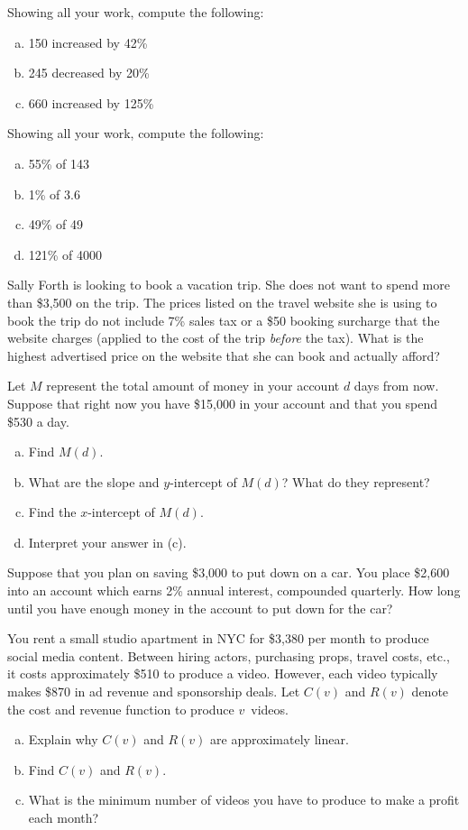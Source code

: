 \documentclass[11pt,letterpaper]{article}
\begin{document}
\prob Showing all your work, compute the following:
	\begin{enumerate}[(a)]
	\item 150 increased by 42\%
	\item 245 decreased by 20\%
	\item 660 increased by 125\%
	\end{enumerate} \pspace


\prob Showing all your work, compute the following:
	\begin{enumerate}[(a)]
	\item 55\% of 143
	\item 1\% of 3.6
	\item 49\% of 49
	\item 121\% of 4000
	\end{enumerate} \pspace


\prob Sally Forth is looking to book a vacation trip. She does not want to spend more than \$3,500 on the trip. The prices listed on the travel website she is using to book the trip do not include 7\% sales tax or a \$50 booking surcharge that the website charges (applied to the cost of the trip \textit{before} the tax). What is the highest advertised price on the website that she can book and actually afford? \pspace	


\prob Let $M$ represent the total amount of money in your account $d$ days from now. Suppose that right now you have \$15,000 in your account and that you spend \$530 a day.
	\begin{enumerate}[(a)]
	\item Find $M(d)$.
	\item What are the slope and $y$-intercept of $M(d)$? What do they represent?
	\item Find the $x$-intercept of $M(d)$.
	\item Interpret your answer in (c). 
	\end{enumerate} \pspace
	

\prob Suppose that you plan on saving \$3,000 to put down on a car. You place \$2,600 into an account which earns 2\% annual interest, compounded quarterly. How long until you have enough money in the account to put down for the car? \pspace
	
	
\prob You rent a small studio apartment in NYC for \$3,380 per month to produce social media content. Between hiring actors, purchasing props, travel costs, etc., it costs approximately \$510 to produce a video. However, each video typically makes \$870 in ad revenue and sponsorship deals. Let $C(v)$ and $R(v)$ denote the cost and revenue function to produce $v$~videos. 
	\begin{enumerate}[(a)]
	\item Explain why $C(v)$ and $R(v)$ are approximately linear. 
	\item Find $C(v)$ and $R(v)$. 
	\item What is the minimum number of videos you have to produce to make a profit each month? 
	\end{enumerate} \pspace
	
\end{document}
